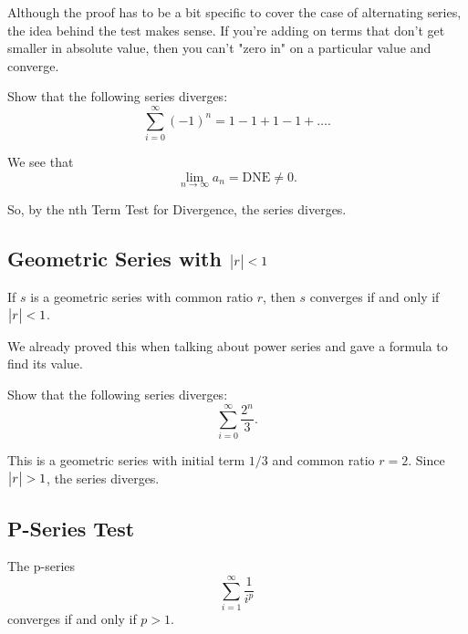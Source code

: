 Although the proof has to be a bit specific to cover the case of alternating series, the idea behind the test makes sense.
If you're adding on terms that don't get smaller in absolute value, then you can't "zero in" on a particular value and converge.

\begin{example}
	Show that the following series diverges:
	\begin{equation*}
		\sum_{i=0}^{\infty}{(-1)^n} = 1 - 1 + 1 - 1 + \ldots.
	\end{equation*}
\end{example}
\begin{answer}
	We see that
	\begin{equation*}
		\lim_{n\to\infty}{a_n} = \text{DNE} \neq 0.
	\end{equation*}
	
	So, by the nth Term Test for Divergence, the series diverges.
\end{answer}

\subsection{Geometric Series with $\big\lvert r \big\rvert < 1$}
\begin{lemma}
	If $s$ is a geometric series with common ratio $r$, then $s$ converges if and only if $\big\lvert r \big\rvert < 1$.
\end{lemma}

We already proved this when talking about power series and gave a formula to find its value.

\begin{example}
	Show that the following series diverges:
	\begin{equation*}
		\sum_{i=0}^{\infty}{\frac{2^n}{3}}.
	\end{equation*}	
\end{example}
\begin{answer}
	This is a geometric series with initial term $1/3$ and common ratio $r=2$.
	Since $\big\lvert r \big\rvert > 1$, the series diverges.
\end{answer}

\subsection{P-Series Test}
\begin{lemma}
	The p-series
	\begin{equation*}
		\sum_{i=1}^{\infty}{\frac{1}{i^p}}
	\end{equation*}
	converges if and only if $p > 1$.
\end{lemma}

